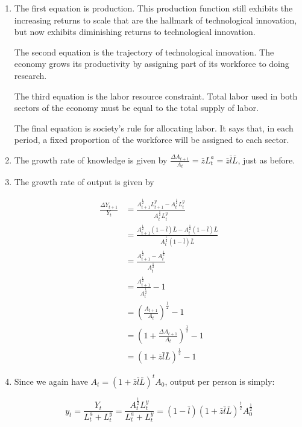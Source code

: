 \documentclass{article}
\newenvironment{solution}{\color{red}}{\color{black}}
\begin{document}
\begin{solution}

\begin{enumerate}
\item The first equation is production. This production function still exhibits the increasing returns to scale that are the hallmark of technological innovation, but now exhibits diminishing returns to technological innovation.

The second equation is the trajectory of technological innovation. The economy grows its productivity by assigning part of its workforce to doing research.

The third equation is the labor resource constraint. Total labor used in both sectors of the economy must be equal to the total supply of labor.

The final equation is society's rule for allocating labor. It says that, in each period, a fixed proportion of the workforce will be assigned to each sector.

\item The growth rate of knowledge is given by $\frac{\Delta A_{t+1}}{A_t} = \bar{z} L^a_t = \bar{z} \bar{l} \bar{L}$, just as before.

\item The growth rate of output is given by 

\begin{align*}
\frac{\Delta Y_{t+1}}{Y_t} &= \frac{A_{t+1}^{\frac12} L^y_{t+1} - A_t^{\frac12} L^y_t}{A_t^{\frac12} L^y_t} \\
 &= \frac{A_{t+1}^{\frac12} \left(1-\bar{l}\right)\bar{L} - A_t^{\frac12} \left(1-\bar{l}\right)\bar{L}}{A_t^{\frac12} \left(1-\bar{l}\right)\bar{L}} \\
 &= \frac{A_{t+1}^{\frac12} - A_t^{\frac12}}{A_t^{\frac12}} \\
 &= \frac{A_{t+1}^{\frac12}}{A_t^{\frac12}} - 1 \\
 &= \left( \frac{A_{t+1}}{A_t}\right)^{\frac12} - 1 \\
 &= \left( 1 + \frac{\Delta A_{t+1}}{A_t} \right)^{\frac12} - 1 \\
 &= \left( 1 + \bar{z} \bar{l} \bar{L} \right)^{\frac12} - 1
\end{align*}

\item Since we again have $A_t = \left(1 + \bar{z} \bar{l} \bar{L} \right)^t A_0$, output per person is simply:

\[ y_t = \frac{Y_t}{L^a_t + L^y_t} = \frac{A_t^{\frac12} L^y_t}{L^a_t + L^y_t} = \left(1 - \bar{l}\right) \left(1 + \bar{z} \bar{l} \bar{L} \right)^{\frac{t}2} A_0^{\frac12} \]
\end{enumerate}

\end{solution}
\end{document}
